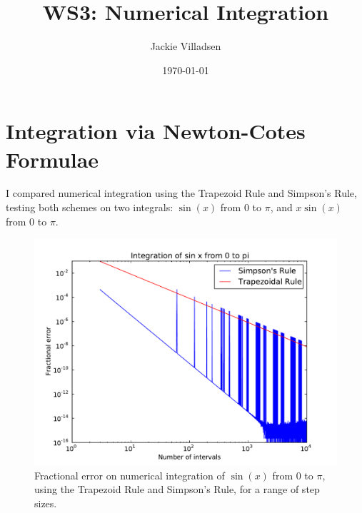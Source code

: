 \documentclass{article}
\begin{document}
\title{WS3: Numerical Integration}
\author{Jackie Villadsen}
\date{\today}
\maketitle


\section{Integration via Newton-Cotes Formulae}
I compared numerical integration using the Trapezoid Rule and Simpson's
Rule, testing both schemes on two integrals: $\sin(x)$ from 0 to $\pi$,
and $x\sin(x)$ from 0 to $\pi$.

\begin{figure}[h]
  \begin{center}
     \includegraphics[width=\textwidth]{sinx}
  \end{center}
  \caption{Fractional error on numerical integration of $\sin(x)$ from 0 to $\pi$, using
	   the Trapezoid Rule and Simpson's Rule, for a range of step sizes.}
  \label{fig:sinx}
\end{figure}
\end{document}
